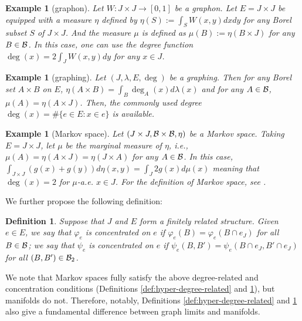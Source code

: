 \documentclass[12pt,a4paper]{article}
\newtheorem{example}[theorem]{Example}
\newtheorem{defn}[theorem]{Definition}
\begin{document}
\begin{example}[graphon]
Let $W:J\times J\to [0,1]$ be a graphon. Let $E=J\times J$ be equipped with a measure $\eta$ defined by $\eta(S):=\int_{S}W(x,y)dxdy$ for any Borel subset $S$ of $J\times J$. 
And the measure $\mu$ is defined as $\mu(B):=\eta(B\times J)$ for any $B\in\mathcal{B}$.  In this case, one can use the %
degree function $\deg(x)=2\int_J W(x,y)dy$ for any $x\in J$. 
\end{example}

\begin{example}[graphing]
Let $(J,\lambda,E,\deg)$ be a graphing. Then for any Borel set $A\times B$ on $E$, $\eta(A\times B)=\int_{B}\deg_A(x)d\lambda(x)$ and for any $A\in\mathcal{B}$,  $\mu(A)=\eta(A\times J)$. %
Then, the commonly used degree $\deg(x)=\#\{e\in E:x\in e\}$ is available. 
\end{example}


\begin{example}[Markov space]Let $(J\times J,\mathcal{B}\times\mathcal{B},\eta)$ be a Markov space. Taking $E=J\times J$, let $\mu$ be the marginal measure of $\eta$, i.e., $\mu(A)=\eta(A\times J)=\eta(J\times A)$ for any $A\in\mathcal{B}$. In this case, $\int_{J\times J}(g(x)+g(y))d\eta(x,y)=\int_J 2g(x)d\mu(x)$ meaning that $\deg(x)=2$ for $\mu$-a.e. $x\in J$. 
For the definition of Markov space, see \cite{KLS24}. 
\end{example}

We further propose the following definition:

\begin{defn}\label{def:hyper-phi-concentrate}
Suppose that $J$ and $E$ form a finitely related structure.  
Given $e\in E$, we say that $\varphi_e$ is \emph{concentrated} on $e$ if $\varphi_e(B)=\varphi_e(B\cap e_J)$ for all $B\in\mathcal{B}$;  %
we say that $\psi_e$ is \emph{concentrated} on $e$ if $\psi_e(B,B')=\psi_e(B\cap e_J,B'\cap e_J)$ for all $(B,B')\in\mathcal{B}_2$. 
\end{defn}



We note that Markov spaces fully   satisfy the above degree-related and concentration conditions (Definitions \ref{def:hyper-degree-related} and 
\ref{def:hyper-phi-concentrate}), but manifolds do not. 
Therefore, notably, Definitions \ref{def:hyper-degree-related} and \ref{def:hyper-phi-concentrate} also give a fundamental difference between graph limits and manifolds. 
\end{document}
